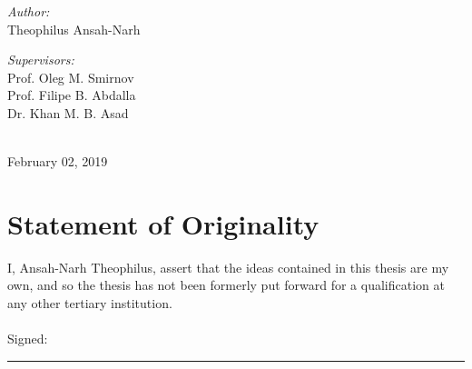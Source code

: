 \begin{titlepage}
\begin{minipage}{0.45\textwidth}
\begin{flushleft}\large 
\emph{Author:} \\
Theophilus  {\sc Ansah-Narh}\\
\end{flushleft}
\end{minipage}
\begin{minipage}{0.45\textwidth}

\begin{flushright} \large
\emph{Supervisors:} \\
Prof. Oleg M. {\sc Smirnov} \\
Prof. Filipe B. {\sc Abdalla} \\
Dr. Khan M. B. {\sc Asad} \\
\end{flushright}
\end{minipage}\\[2cm]

\vfill
{\large February 02, 2019}\\[4cm]


\end{titlepage}



\chapter*{Statement of Originality}
\vspace*{-2em}

 I, {\sc Ansah-Narh} Theophilus, assert that the ideas contained in this thesis are my own, and so the thesis has not been formerly put forward for a qualification at any 
 other tertiary institution. 
 \\~\\
 \noindent Signed:\\
\rule[0.5em]{25em}{0.5pt} %
 
